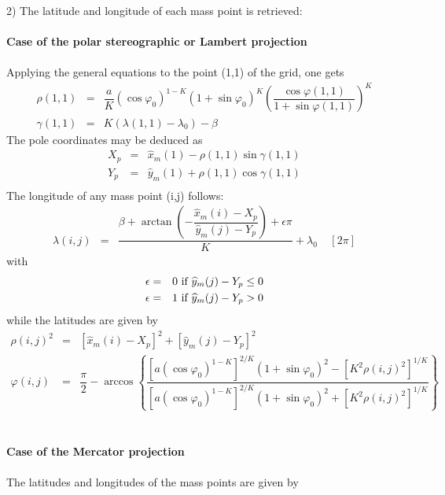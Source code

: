 2) The latitude and longitude of each mass point is retrieved:
\\
\\
{\bf Case of the polar stereographic or Lambert projection}
\\
\\
Applying the general equations to the point (1,1) of the grid, one gets
\begin{eqnarray}
\rho (1,1) & = & \dfrac{a}{K} (\cos\varphi _{0})^{1-K}
 (1 + \sin\varphi _{0})^{K}
\left(\dfrac{\cos\varphi (1,1)}{1 + \sin\varphi (1,1)}\right)^{K} \nonumber\\
\gamma (1,1) & = &   K (\lambda (1,1) - \lambda _{0}) - \beta
\end{eqnarray}
The pole coordinates may be deduced as
\begin{eqnarray}
X_{p} & = &  \widehat{x}_m(1) -  \rho (1,1) \sin\gamma (1,1)  \nonumber \\
Y_{p} & = & \widehat{y}_m(1) + \rho (1,1) \cos\gamma (1,1) \nonumber \\
\end{eqnarray}
The longitude of any mass point (i,j) follows:
\begin{eqnarray}
\lambda (i,j) &=&  \dfrac{\beta + \arctan \left( -
\dfrac{ \widehat{x}_{m}(i)- X_{p}}{ \widehat{y}_{m}(j)- Y_{p}}
 \right) + \epsilon  \pi}{K} + \lambda_{0} \; \; \; \;  \left[ 2 \pi \right]
\end{eqnarray}
with
\begin{eqnarray*}
\epsilon & = & 0 \hbox{ if } \widehat{y}_{m}(j)- Y_{p} \leq 0 \\
\epsilon & = & 1 \hbox{ if } \widehat{y}_{m}(j)- Y_{p} > 0
\end{eqnarray*}
while the latitudes are given by
\begin{eqnarray}
\rho  (i,j)^{2} &=&  \left[ \widehat{x}_m(i) - X_{p} \right]^{2} +
 \left[ \widehat{y}_m(j) - Y_{p}\right] ^{2} \nonumber \\
\varphi (i,j) &=& \dfrac{\pi}{2} - \arccos \left\{ \dfrac{
\left[ a (\cos \varphi_{0})^{1-K} \right] ^{2/K} (1 + \sin\varphi _{0})^{2} -
\left[ K^{2} \rho  (i,j)^{2} \right] ^{1/K} }{
\left[ a (\cos \varphi_{0})^{1-K} \right] ^{2/K} (1 + \sin\varphi _{0})^{2}+
 \left[ K^{2} \rho  (i,j)^{2}  \right] ^{1/K} }
\right\}
\end{eqnarray}
\\
\\
{\bf Case of the Mercator projection}
\\
\\
The latitudes and longitudes of the mass points are given by
